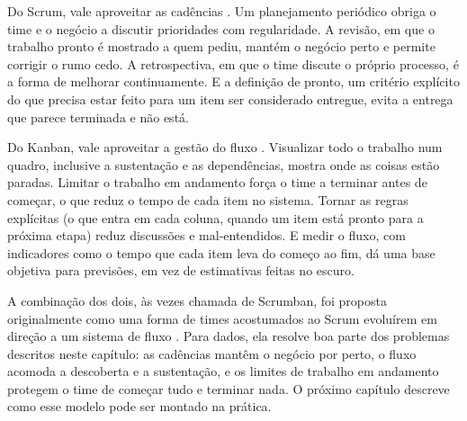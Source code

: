 Do Scrum, vale aproveitar as cadências \parencite{scrumguide2020}. Um planejamento periódico
obriga o time e o negócio a discutir prioridades com regularidade. A revisão, em que o
trabalho pronto é mostrado a quem pediu, mantém o negócio perto e permite corrigir o rumo cedo.
A retrospectiva, em que o time discute o próprio processo, é a forma de melhorar
continuamente. E a definição de pronto, um critério explícito do que precisa estar feito para
um item ser considerado entregue, evita a entrega que parece terminada e não está.

Do Kanban, vale aproveitar a gestão do fluxo \parencite{anderson2010}. Visualizar todo o
trabalho num quadro, inclusive a sustentação e as dependências, mostra onde as coisas estão
paradas. Limitar o trabalho em andamento força o time a terminar antes de começar, o que reduz
o tempo de cada item no sistema. Tornar as regras explícitas (o que entra em cada coluna,
quando um item está pronto para a próxima etapa) reduz discussões e mal-entendidos. E medir o
fluxo, com indicadores como o tempo que cada item leva do começo ao fim, dá uma base objetiva
para previsões, em vez de estimativas feitas no escuro.

A combinação dos dois, às vezes chamada de Scrumban, foi proposta originalmente como uma forma
de times acostumados ao Scrum evoluírem em direção a um sistema de fluxo \parencite{ladas2009}.
Para dados, ela resolve boa parte dos problemas descritos neste capítulo: as cadências mantêm o
negócio por perto, o fluxo acomoda a descoberta e a sustentação, e os limites de trabalho em
andamento protegem o time de começar tudo e terminar nada. O próximo capítulo descreve como
esse modelo pode ser montado na prática.

\begin{leituras}
\end{leituras}
